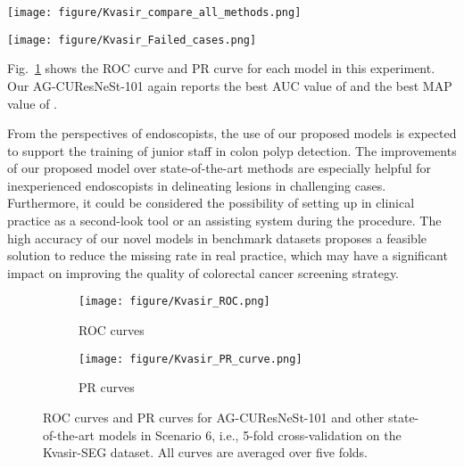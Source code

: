 \documentclass[review, sort&compress]{elsarticle}
\begin{document}
\begin{figure*}[!ht]
\centering
\texttt{[image: figure/Kvasir\_compare\_all\_methods.png]}
\caption{Qualitative result comparison of different models trained in Scenario 6, i.e., 5-fold cross-validation on the Kvasir-SEG dataset.}
\label{fig_kvasir_results}
\end{figure*}


\begin{figure*}[!ht]
\centering
\texttt{[image: figure/Kvasir\_Failed\_cases.png]}
\caption{Some failed cases of our model on the Kvasir-SEG dataset}
\label{fig_kvasir_failed_results}
\end{figure*}

Fig.~\ref{fig_kvasir_ROC} shows the ROC curve and PR curve for each model in this experiment. Our AG-CUResNeSt-101 again reports the best AUC value of  and the best MAP value of .

From the perspectives of endoscopists, the use of our proposed models is expected to support the training of junior staff in colon polyp detection. The improvements of our proposed model over state-of-the-art methods are especially helpful for inexperienced endoscopists in delineating lesions in challenging cases. Furthermore, it could be considered the possibility of setting up in clinical practice as a second-look tool or an assisting system during the procedure. The high accuracy of our novel models in benchmark datasets proposes a feasible solution to reduce the missing rate in real practice, which may have a significant impact on improving the quality of colorectal cancer screening strategy.


\begin{figure} [h!]
\centering
\begin{subfigure}[b]{0.49\textwidth}
\centering
\texttt{[image: figure/Kvasir\_ROC.png]}
\caption{ROC curves}
\end{subfigure}
\hfill
\begin{subfigure}[b]{0.49\textwidth}
\centering
\texttt{[image: figure/Kvasir\_PR\_curve.png]}
\caption{PR curves}
\end{subfigure}
\caption{ROC curves and PR curves for AG-CUResNeSt-101 and other state-of-the-art models in Scenario 6, i.e., 5-fold cross-validation on the Kvasir-SEG dataset. All curves are averaged over five folds.}
\label{fig_kvasir_ROC}
\end{figure}
\end{document}
